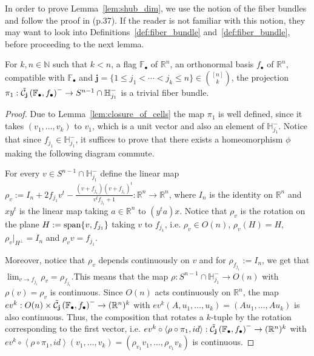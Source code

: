 In order to prove Lemma~\ref{lem:shub_dim}, we use the notion of the fiber bundles and follow the proof in \cite{vec_bundles} (p.37). If the reader is not familiar with this notion, they may want to look into Definitions~\ref{def:fiber_bundle} and~\ref{def:fiber_bundle}, before proceeding to the next lemma.
\begin{lemma}\label{lem:trivial_fb} For $k,n\in\mathbb{N}$ such that $k<n$, a flag $\mathbb{F}_{\bullet}$ of $\mathbb{R}^n$, an orthonormal basis $f_{\bullet}$ of $\mathbb{R}^n$, compatible with $\mathbb{F}_{\bullet}$ and $\mathbf{j}=\{1\leq j_1<\cdots<j_k\leq n\}\in\binom{[n]}{k}$, the projection $\pi_1:\tilde{\mathcal{C}}_{\mathbf{j}}\left(\mathbb{F}_{\bullet},f_{\bullet}\right)^-\to S^{n-1}\cap\mathbb{H}_{j_1}^-$ is a trivial fiber bundle.
\end{lemma}
\begin{proof} Due to Lemma~\ref{lem:closure_of_cells} the map $\pi_1$ is well defined, since it takes $(v_1,\ldots,v_k)$ to $v_1$, which is a unit vector and also an element of $\mathbb{H}_{j_1}^-$. Notice that since $f_{j_1}\in\mathbb{H}_{j_1}^-$, it suffices to prove that there exists a homeomorphism $\phi$ making the following diagram commute.
\begin{center}
\end{center}
For every $v\in S^{n-1}\cap\mathbb{H}_{j_1}^-$ define the linear map $\rho_v:=I_n+2f_{j_1}v^t-\frac{(v+f_{j_1})(v+f_{j_1})^t}{v^tf_{j_1}+1}:\mathbb{R}^n\to\mathbb{R}^n$, where $I_n$ is the identity on $\mathbb{R}^n$ and $xy^t$ is the linear map taking $a\in\mathbb{R}^n$ to $(y^ta)x$. Notice that $\rho_v$ is the rotation on the plane $H:=\mathrm{span}\{v,f_{j_1}\}$ taking $v$ to $f_{j_1}$, i.e. $\rho_v\in O(n)$, $\rho_v(H)=H$, $\rho_v|_{H^{\perp}}=I_n$ and $\rho_vv=f_{j_1}$.

Moreover, notice that $\rho_v$ depends continuously on $v$ and for $\rho_{f_{j_1}}:=I_n$, we get that $\lim_{v\to f_{j_1}}\rho_v=\rho_{f_{j_1}}$.This means that the map $\rho:S^{n-1}\cap\mathbb{H}_{j_1}^-\to O(n)$ with $\rho(v)=\rho_v$ is continuous. Since $O(n)$ acts continuously on $\mathbb{R}^n$, the map $ev^k:O(n)\times\tilde{\mathcal{C}}_{\mathbf{j}}\left(\mathbb{F}_{\bullet},f_{\bullet}\right)^-\to(\mathbb{R}^n)^k$ with $ev^k(A,u_1,\ldots,u_k)=(Au_1,\ldots,Au_k)$ is also continuous. Thus, the composition that rotates a $k$-tuple by the rotation corresponding to the first vector, i.e. $ev^k\circ\left<\rho\circ\pi_1,id\right>:\tilde{\mathcal{C}}_{\mathbf{j}}\left(\mathbb{F}_{\bullet},f_{\bullet}\right)^-\to(\mathbb{R}^n)^k$ with $ev^k\circ\left<\rho\circ\pi_1,id\right>(v_1,\ldots,v_k)=(\rho_{v_1}v_1,\ldots,\rho_{v_1}v_k)$ is continuous.


\end{proof}
